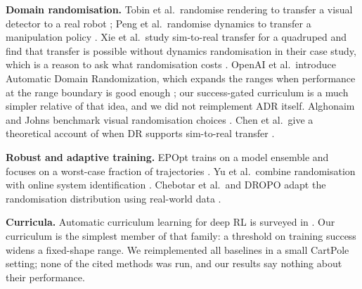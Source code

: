 \textbf{Domain randomisation.} Tobin et al.\ randomise rendering to transfer a visual detector to a real robot \cite{tobin2017domain}; Peng et al.\ randomise dynamics to transfer a manipulation policy \cite{peng2018sim}. Xie et al.\ study sim-to-real transfer for a quadruped and find that transfer is possible without dynamics randomisation in their case study, which is a reason to ask what randomisation costs \cite{xie2021dynamics}. OpenAI et al.\ introduce Automatic Domain Randomization, which expands the ranges when performance at the range boundary is good enough \cite{openai2019solving}; our success-gated curriculum is a much simpler relative of that idea, and we did not reimplement ADR itself. Alghonaim and Johns benchmark visual randomisation choices \cite{alghonaim2020benchmarking}. Chen et al.\ give a theoretical account of when DR supports sim-to-real transfer \cite{chen2021understanding}.

\textbf{Robust and adaptive training.} EPOpt trains on a model ensemble and focuses on a worst-case fraction of trajectories \cite{rajeswaran2016epopt}. Yu et al.\ combine randomisation with online system identification \cite{yu2017preparing}. Chebotar et al.\ and DROPO adapt the randomisation distribution using real-world data \cite{chebotar2019closing,tiboni2022dropo}.

\textbf{Curricula.} Automatic curriculum learning for deep RL is surveyed in \cite{portelas2020automatic}. Our curriculum is the simplest member of that family: a threshold on training success widens a fixed-shape range. We reimplemented all baselines in a small CartPole setting; none of the cited methods was run, and our results say nothing about their performance.

